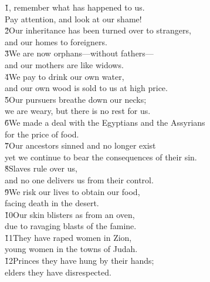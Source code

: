 \begin{poetry}
\poeml {}
\v{1}, remember what has happened to us. \\
\poemll    Pay attention, and look at our shame! \\
\poeml \v{2}Our inheritance has been turned over to strangers, \\
\poemll    and our homes to foreigners. \\
\poeml \v{3}We are now orphans---without fathers--- \\
\poemll    and our mothers are like widows. \\
\poeml \v{4}We pay to drink our own water, \\
\poemll    and our own wood is sold to us at high price. \\
\poeml \v{5}Our pursuers breathe down our necks; \\
\poemll    we are weary, but there is no rest for us. \\
\poeml \v{6}We made a deal with the Egyptians and the Assyrians \\
\poemll    for the price of food. \\
\poeml \v{7}Our ancestors sinned and no longer exist \\
\poemll    yet we continue to bear the consequences of their sin. \\
\poeml \v{8}Slaves rule over us, \\
\poemll    and no one delivers us from their control. \\
\poeml \v{9}We risk our lives to obtain our food, \\
\poemll    facing death in the desert. \\
\poeml \v{10}Our skin blisters as from an oven, \\
\poemll    due to ravaging blasts of the famine. \\
\poeml \v{11}They have raped women in Zion, \\
\poemll    young women in the towns of Judah. \\
\poeml \v{12}Princes they have hung by their hands; \\
\poemll    elders they have disrespected. \\

\end{poetry}
